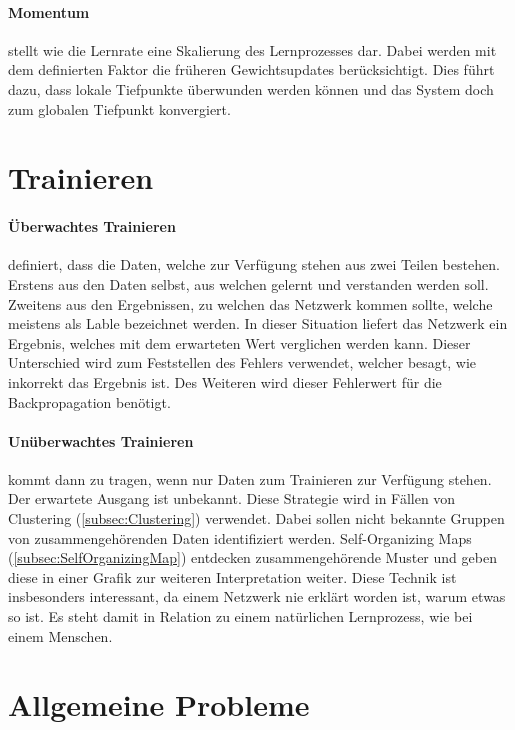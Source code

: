 \paragraph{Momentum} stellt wie die Lernrate eine Skalierung des Lernprozesses dar.
Dabei werden mit dem definierten Faktor die früheren Gewichtsupdates berücksichtigt. 
Dies führt dazu, dass lokale Tiefpunkte überwunden werden können und das System doch zum globalen Tiefpunkt konvergiert.

\section{Trainieren}

\paragraph{Überwachtes Trainieren} definiert, dass die Daten, welche zur Verfügung stehen aus zwei Teilen bestehen.
Erstens aus den Daten selbst, aus welchen gelernt und verstanden werden soll.
Zweitens aus den Ergebnissen, zu welchen das Netzwerk kommen sollte, welche meistens als Lable bezeichnet werden. 
In dieser Situation liefert das Netzwerk ein Ergebnis, welches mit dem erwarteten Wert verglichen werden kann.
Dieser Unterschied wird zum Feststellen des Fehlers verwendet, welcher besagt, wie inkorrekt das Ergebnis ist.
Des Weiteren wird dieser Fehlerwert für die Backpropagation benötigt.

\paragraph{Unüberwachtes Trainieren} kommt dann zu tragen, wenn nur Daten zum Trainieren zur Verfügung stehen.
Der erwartete Ausgang ist unbekannt.
Diese Strategie wird in Fällen von Clustering (\ref{subsec:Clustering}) verwendet.
Dabei sollen nicht bekannte Gruppen von zusammengehörenden Daten identifiziert werden. 
Self-Organizing Maps (\ref{subsec:SelfOrganizingMap}) entdecken zusammengehörende Muster und geben diese in einer Grafik zur weiteren Interpretation weiter. 
Diese Technik ist insbesonders interessant, da einem Netzwerk nie erklärt worden ist, warum etwas so ist. 
Es steht damit in Relation zu einem natürlichen Lernprozess, wie bei einem Menschen.

\section{Allgemeine Probleme}
\label{sec:AllgeProb}

